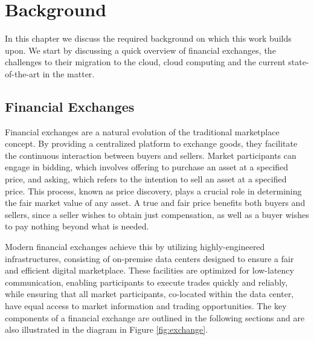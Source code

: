 \chapter{Background}


In this chapter we discuss the required background on which this work builds upon.
We start by discussing a quick overview of financial exchanges, the challenges to their 
migration to the cloud, cloud computing and the current state-of-the-art in the matter.

\section{Financial Exchanges}
Financial exchanges are a natural evolution of the traditional marketplace concept. 
By providing a centralized platform to exchange goods, they facilitate the continuous 
interaction between buyers and sellers. 
Market participants can engage in bidding, which involves offering to purchase an asset at a specified price, 
and asking, which refers to the intention to sell an asset at a specified price. 
This process, known as price discovery, plays a crucial role in determining the fair market value of any asset.
A true and fair price benefits both buyers and sellers, since a seller wishes to obtain just compensation, as well as a buyer 
wishes to pay nothing beyond what is needed.

Modern financial exchanges achieve this by utilizing highly-engineered infrastructures, 
consisting of on-premise data centers designed to ensure a fair and efficient digital marketplace. 
These facilities are optimized for low-latency communication, enabling participants to 
execute trades quickly and reliably, while ensuring that all market participants, co-located within the 
data center, have equal access to market information and trading opportunities.
The key components of a financial exchange are outlined in the following sections and 
are also illustrated in the diagram in Figure \ref{fig:exchange}.


